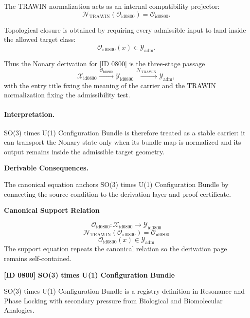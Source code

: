 The TRAWIN normalization acts as an internal compatibility projector:\[
\mathcal{N}_{\mathrm{TRAWIN}}(\mathcal{O}_{\mathrm{id0800}})=\mathcal{O}_{\mathrm{id0800}}.
\]

Topological closure is obtained by requiring every admissible input to land inside the allowed target class:\[
\mathcal{O}_{\mathrm{id0800}}(x)\in\mathcal{Y}_{\mathrm{adm}}.
\]

Thus the Nonary derivation for [ID 0800] is the three-stage passage
\[
\mathcal{X}_{\mathrm{id0800}}\xrightarrow{\,\mathcal{O}_{\mathrm{id0800}}\,} \mathcal{Y}_{\mathrm{id0800}}\xrightarrow{\,\mathcal{N}_{\mathrm{TRAWIN}}\,} \mathcal{Y}_{\mathrm{adm}},
\]
with the entry title fixing the meaning of the carrier and the TRAWIN normalization fixing the admissibility test.

\paragraph{Interpretation.} SO(3) times U(1) Configuration Bundle is therefore treated as a stable carrier: it can transport the Nonary state only when its bundle map is normalized and its output remains inside the admissible target geometry.

\par\vspace{0.35em}
\noindent\textbf{Derivable Consequences.}\quad
\begingroup
\footnotesize
\raggedright
The canonical equation anchors SO(3) times U(1) Configuration Bundle by connecting the source condition to the derivation layer and proof certificate.
\par\endgroup

\noindent\textbf{Canonical Support Relation}\par
\[
\mathcal{O}_{\mathrm{id0800}}:\mathcal{X}_{\mathrm{id0800}}\longrightarrow\mathcal{Y}_{\mathrm{id0800}}
\]
\[
\mathcal{N}_{\mathrm{TRAWIN}}(\mathcal{O}_{\mathrm{id0800}})=\mathcal{O}_{\mathrm{id0800}}
\]
\[
\mathcal{O}_{\mathrm{id0800}}(x)\in\mathcal{Y}_{\mathrm{adm}}
\]
\noindent The support equation repeats the canonical relation so the derivation page remains self-contained.\par

\clearpage
\noindent\textbf{[ID 0800] SO(3) times U(1) Configuration Bundle}\par
\vspace{0.35em}
\begingroup\small
{}
SO(3) times U(1) Configuration Bundle is a registry definition in Resonance and Phase Locking with secondary pressure from Biological and Biomolecular Analogies.

